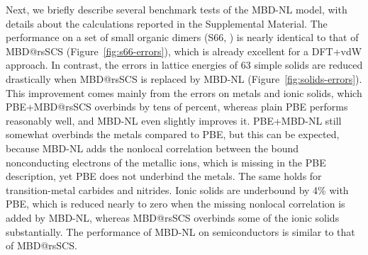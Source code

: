 Next, we briefly describe several benchmark tests of the MBD-NL model, with details about the calculations reported in the Supplemental Material.
The performance on a set of small organic dimers (S66, \citealp{RezacJCTC11}) is nearly identical to that of MBD@rsSCS (Figure~\ref{fig:s66-errors}), which is already excellent for a DFT+vdW approach.
In contrast, the errors in lattice energies of 63 simple solids \citep{ZhangNJP18} are reduced drastically when MBD@rsSCS is replaced by MBD-NL (Figure~\ref{fig:solids-errors}).
This improvement comes mainly from the errors on metals and ionic solids, which PBE+MBD@rsSCS overbinds by tens of percent, whereas plain PBE performs reasonably well, and MBD-NL even slightly improves it.
PBE+MBD-NL still somewhat overbinds the metals compared to PBE, but this can be expected, because MBD-NL adds the nonlocal correlation between the bound nonconducting electrons of the metallic ions, which is missing in the PBE description, yet PBE does not underbind the metals.
The same holds for transition-metal carbides and nitrides.
Ionic solids are underbound by 4\% with PBE, which is reduced nearly to zero when the missing nonlocal correlation is added by MBD-NL, whereas MBD@rsSCS overbinds some of the ionic solids substantially.
The performance of MBD-NL on semiconductors is similar to that of MBD@rsSCS\@.

